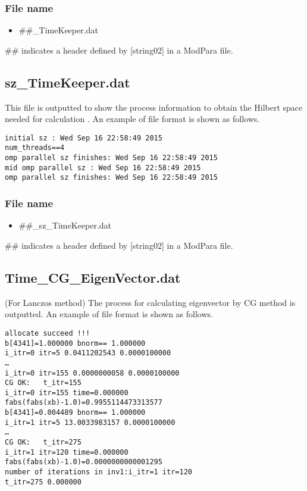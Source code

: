 \subsubsection{File name}
 \begin{itemize}
   \item  \#\#\_TimeKeeper.dat
  \end{itemize}
  \#\# indicates a header defined by [string02] in a ModPara file.

\subsection{sz\_TimeKeeper.dat}
This file is outputted to show the process information to obtain the Hilbert space needed for calculation .
An example of file format is shown as follows.

\begin{minipage}{12.5cm}
\begin{screen}
\begin{verbatim}
initial sz : Wed Sep 16 22:58:49 2015
num_threads==4
omp parallel sz finishes: Wed Sep 16 22:58:49 2015
mid omp parallel sz : Wed Sep 16 22:58:49 2015
omp parallel sz finishes: Wed Sep 16 22:58:49 2015
\end{verbatim}
\end{screen}
\end{minipage}

\subsubsection{File name}
 \begin{itemize}
   \item  \#\#\_sz\_TimeKeeper.dat
 \end{itemize}
 \#\# indicates a header defined by [string02] in a ModPara file.
 
\newpage
\subsection{Time\_CG\_EigenVector.dat}
\label{Subsec:timecgeigenv}
(For Lanczos method) The process for calculating eigenvector by CG method is outputted.
An example of file format is shown as follows.

\begin{minipage}{12.5cm}
\begin{screen}
\begin{verbatim}
allocate succeed !!! 
b[4341]=1.000000 bnorm== 1.000000 
i_itr=0 itr=5 0.0411202543 0.0000100000 
…
i_itr=0 itr=155 0.0000000058 0.0000100000 
CG OK:   t_itr=155 
i_itr=0 itr=155 time=0.000000  
fabs(fabs(xb)-1.0)=0.9955114473313577
b[4341]=0.004489 bnorm== 1.000000 
i_itr=1 itr=5 13.0033983157 0.0000100000 
…
CG OK:   t_itr=275 
i_itr=1 itr=120 time=0.000000  
fabs(fabs(xb)-1.0)=0.0000000000001295
number of iterations in inv1:i_itr=1 itr=120 
t_itr=275 0.000000
\end{verbatim}
\end{screen}
\end{minipage}


